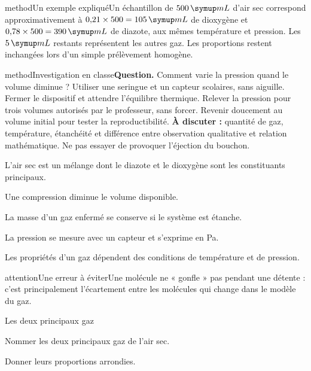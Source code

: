 \begin{pcEncadre}{method}{Un exemple expliqué}Un échantillon de $500\unite{mL}$ d’air sec correspond approximativement à $0{,}21\times500=105\unite{mL}$ de dioxygène et $0{,}78\times500=390\unite{mL}$ de diazote, aux mêmes température et pression. Les $5\unite{mL}$ restants représentent les autres gaz. Les proportions restent inchangées lors d’un simple prélèvement homogène.\end{pcEncadre}
\label{activite-2}
\begin{pcEncadre}{method}{Investigation en classe}\textbf{Question.} Comment varie la pression quand le volume diminue ? Utiliser une seringue et un capteur scolaires, sans aiguille. Fermer le dispositif et attendre l’équilibre thermique. Relever la pression pour trois volumes autorisés par le professeur, sans forcer. Revenir doucement au volume initial pour tester la reproductibilité. \textbf{À discuter :} quantité de gaz, température, étanchéité et différence entre observation qualitative et relation mathématique. Ne pas essayer de provoquer l’éjection du bouchon.\end{pcEncadre}
\begin{questions}
\item L’air sec est un mélange dont le diazote et le dioxygène sont les constituants principaux.
\item Une compression diminue le volume disponible.
\item La masse d’un gaz enfermé se conserve si le système est étanche.
\item La pression se mesure avec un capteur et s’exprime en Pa.
\item Les propriétés d’un gaz dépendent des conditions de température et de pression.
\end{questions}
\begin{pcEncadre}{attention}{Une erreur à éviter}Une molécule ne « gonfle » pas pendant une détente : c’est principalement l’écartement entre les molécules qui change dans le modèle du gaz.\end{pcEncadre}
\pcGrille
\clearpage{}
\par\noindent\begin{minipage}{\linewidth}
\begin{exercice}[1]{Les deux principaux gaz}
\begin{questions}
\item Nommer les deux principaux gaz de l’air sec.
\item Donner leurs proportions arrondies.
\end{questions}
\end{exercice}
\end{minipage}
